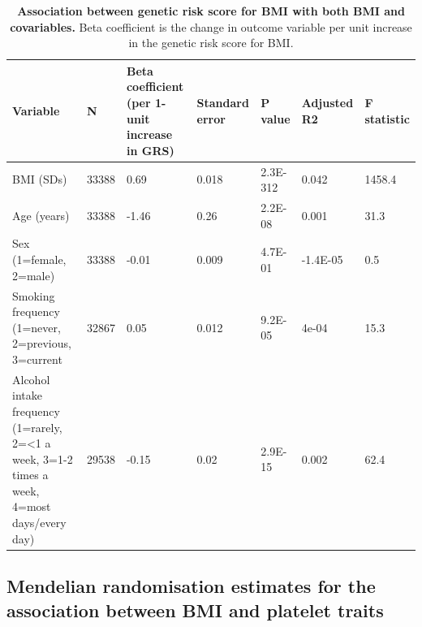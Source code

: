 \documentclass[11pt,twoside]{bristolthesis}
\begin{document}
\begin{table}

\caption[Association between genetic risk score for BMI with both BMI and covariables]{\label{tab:INT-GRS-confounders-platelets}\textbf{Association between genetic risk score for BMI with both BMI and covariables.} Beta coefficient is the change in outcome variable per unit increase in the genetic risk score for BMI.}
\centering
\fontsize{8}{10}\selectfont
\begin{tabu} to 
\toprule
Variable & N & Beta coefficient (per 1-unit increase in GRS) & Standard error & P value & Adjusted R2 & F statistic\\
\midrule
BMI (SDs) & 33388 & 0.69 & 0.018 & 2.3E-312 & 0.042 & 1458.4\\
Age (years) & 33388 & -1.46 & 0.26 & 2.2E-08 & 0.001 & 31.3\\
Sex (1=female, 2=male) & 33388 & -0.01 & 0.009 & 4.7E-01 & -1.4E-05 & 0.5\\
Smoking frequency (1=never, 2=previous, 3=current & 32867 & 0.05 & 0.012 & 9.2E-05 & 4e-04 & 15.3\\
Alcohol intake frequency (1=rarely, 2=<1 a week, 3=1-2 times a week, 4=most days/every day) & 29538 & -0.15 & 0.02 & 2.9E-15 & 0.002 & 62.4\\
\bottomrule
\end{tabu}
\end{table}
\hypertarget{mendelian-randomisation-estimates-for-the-association-between-bmi-and-platelet-traits}{%
\subsection{Mendelian randomisation estimates for the association between BMI and platelet traits}\label{mendelian-randomisation-estimates-for-the-association-between-bmi-and-platelet-traits}}
\end{document}
